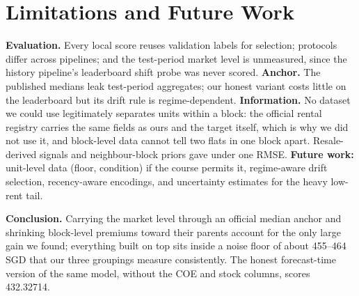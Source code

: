 \documentclass[conference]{IEEEtran}
\newif\ifshowsrc
\newcommand{\src}[1]{\ifshowsrc\textsuperscript{\tiny\color{gray}[#1]}\fi}
\begin{document}
\section{Limitations and Future Work}
\textbf{Evaluation.} Every local score reuses validation labels for selection;\src{Pu-sel} protocols differ across pipelines; and the test-period market level is unmeasured, since the history pipeline's leaderboard shift probe was never scored.\src{Pu-probe} \textbf{Anchor.} The published medians leak test-period aggregates; our honest variant costs little on the leaderboard but its drift rule is regime-dependent. \textbf{Information.} No dataset we could use legitimately separates units within a block: the official rental registry carries the same fields as ours and the target itself, which is why we did not use it, and block-level data cannot tell two flats in one block apart.\cite{hdbrent} Resale-derived signals and neighbour-block priors gave under one RMSE.\src{Aa-resale} \textbf{Future work:} unit-level data (floor, condition) if the course permits it, regime-aware drift selection, recency-aware encodings, and uncertainty estimates for the heavy low-rent tail.

\textbf{Conclusion.} Carrying the market level through an official median anchor and shrinking block-level premiums toward their parents account for the only large gain we found; everything built on top sits inside a noise floor of about 455--464 SGD that our three groupings measure consistently. The honest forecast-time version of the same model, without the COE and stock columns, scores 432.32714.\src{Aa-coe-lb}
\end{document}
